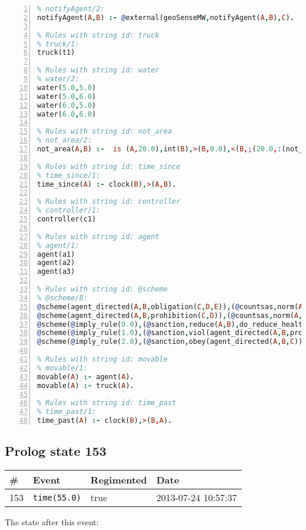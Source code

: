 \documentclass[11pt]{article}\usepackage[utf8]{inputenc}\usepackage{geometry}
\begin{document}
\begin{lstlisting}[language=Prolog, numbers=left]
% Rules with string id: notifyAgent
% notifyAgent/2:
notifyAgent(A,B) :- @external(geoSenseMW,notifyAgent(A,B),C).

% Rules with string id: truck
% truck/1:
truck(t1)

% Rules with string id: water
% water/2:
water(5.0,5.0)
water(5.0,6.0)
water(6.0,5.0)
water(6.0,6.0)

% Rules with string id: not_area
% not_area/2:
not_area(A,B) :-  is (A,20.0),int(B),>(B,0.0),<(B,;(20.0,:(not_area(A,B), is (-(B),20.0)))),int(A),>(A,0.0),<(A,;(20.0,:(area(A,B),-(int(A))))),int(B),>(A,0.0),>(B,0.0),<(A,21.0),<(B,21.0).

% Rules with string id: time_since
% time_since/1:
time_since(A) :- clock(B),>(A,B).

% Rules with string id: controller
% controller/1:
controller(c1)

% Rules with string id: agent
% agent/1:
agent(a1)
agent(a2)
agent(a3)

% Rules with string id: @scheme
% @scheme/8:
@scheme(agent_directed(A,B,obligation(C,D,E)),(@countsas,norm(A,B,F,obligation(C,D,E)),F),false,(listTrue(C)),(time_past(D)),false,[plus(viol(agent_directed(A,B,obligation(C,D,E))))|[]],[plus(obey(agent_directed(A,B,obligation(C,D,E))))|[]])
@scheme(agent_directed(A,B,prohibition(C,D)),(@countsas,norm(A,B,E,prohibition(C,D)),E),(listTrue(C)),false,(false),false,[plus(viol(agent_directed(A,B,prohibition(C,D))))|[]],[plus(obey(agent_directed(A,B,prohibition(C,D))))|[]])
@scheme(@imply_rule(0.0),(@sanction,reduce(A,B),do_reduce_health(A,B),notifyAgent(A,changed(status))),true,false,false,false,[min(reduce(A,B))|[]],[])
@scheme(@imply_rule(1.0),(@sanction,viol(agent_directed(A,B,prohibition(C,D))),do_sanction(D)),true,false,false,false,[min(viol(agent_directed(A,B,prohibition(C,D))))|[]],[])
@scheme(@imply_rule(2.0),(@sanction,obey(agent_directed(A,B,C))),true,false,false,false,[min(obey(agent_directed(A,B,C)))|[]],[])

% Rules with string id: movable
% movable/1:
movable(A) :- agent(A).
movable(A) :- truck(A).

% Rules with string id: time_past
% time_past/1:
time_past(A) :- clock(B),>(B,A).

\end{lstlisting}
\clearpage 
\subsection{Prolog state 153}
\begin{table}[ht]
\centering 
\begin{tabular}{l l l l} 
\textbf{\#} & \textbf{Event} & \textbf{Regimented} & \textbf{Date} \\ [0.5ex] 
\hline
153&\texttt{time(55.0)}&true&2013-07-24 10:57:37\\ [1ex] \hline\end{tabular}
\end{table}
The state after this event:
\end{document}
